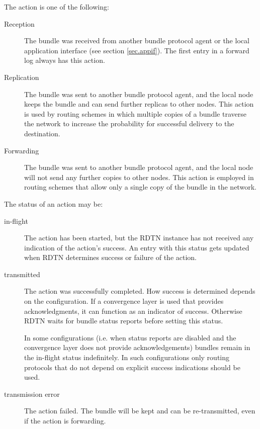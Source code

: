 \documentclass[a4paper]{article}
\begin{document}
The action is one of the following:
\begin{description}

\item[Reception] The bundle was received from another bundle protocol agent or
the local application interface (see section \ref{sec.appif}). 
The first entry in a forward log always has this action.

\item[Replication] The bundle was sent to another bundle protocol agent, and the
local node keeps the bundle and can send further replicas to other nodes. This
action is used by routing schemes in which multiple copies of a bundle traverse
the network to increase the probability for successful delivery to the
destination.

\item[Forwarding] The bundle was sent to another bundle protocol agent, and the
local node will not send any further copies to other nodes. This action is
employed in routing schemes that allow only a single copy of the bundle in the
network.

\end{description}

The status of an action may be:
\begin{description}

\item[in-flight] The action has been started, but the RDTN instance has not
received any indication of the action's success. An entry with this status gets
updated when RDTN determines success or failure of the action.

\item[transmitted] The action was successfully completed. How success is
determined depends on the configuration. If a convergence layer is used that
provides acknowledgments, it can function as an indicator of success. Otherwise
RDTN waits for bundle status reports before setting this status.

In some configurations (i.e. when status reports are disabled and the
convergence layer does not provide acknowledgements) bundles remain in the
in-flight status indefinitely. In such configurations only routing protocols
that do not depend on explicit success indications should be used.

\item[transmission error] The action failed. The bundle will be kept and can be
re-transmitted, even if the action is forwarding.

\end{description}
\end{document}
